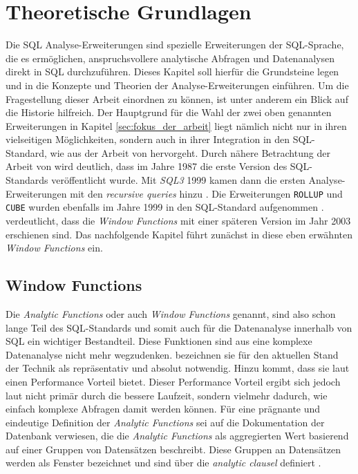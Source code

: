 \chapter{Theoretische Grundlagen}
\label{chap:hintergund_und_grundlagen} Die SQL Analyse-Erweiterungen sind spezielle
Erweiterungen der SQL-Sprache, die es ermöglichen, anspruchsvollere analytische Abfragen
und Datenanalysen direkt in SQL durchzuführen. Dieses Kapitel soll hierfür die
Grundsteine legen und in die Konzepte und Theorien der Analyse-Erweiterungen
einführen. Um die Fragestellung dieser Arbeit einordnen zu können, ist unter
anderem ein Blick auf die Historie hilfreich. Der Hauptgrund für die Wahl der zwei
oben genannten Erweiterungen in Kapitel \ref{sec:fokus_der_arbeit} liegt nämlich
nicht nur in ihren vielseitigen Möglichkeiten, sondern auch in ihrer Integration
in den SQL-Standard, wie aus der Arbeit von \citet[S.~10]{grust2017advanced}
hervorgeht. Durch nähere Betrachtung der Arbeit von \citet[S.~10]{grust2017advanced} wird
deutlich, dass im Jahre 1987 die erste Version des SQL-Standards veröffentlicht
wurde. Mit \textit{SQL3} 1999 kamen dann die ersten Analyse-Erweiterungen mit den \textit{recursive
queries} hinzu \citep[vgl.][S.~10]{grust2017advanced}. Die Erweiterungen \texttt{ROLLUP}
und \texttt{CUBE} wurden ebenfalls im Jahre 1999 in den SQL-Standard aufgenommen
\citep[vgl.][Kapitel 9.12]{melton2001sql}. \citet[S.~10]{grust2017advanced}
verdeutlicht, dass die \textit{Window Functions} mit einer späteren Version im
Jahr 2003 erschienen sind. Das nachfolgende Kapitel führt zunächst in diese eben
erwähnten \textit{Window Functions} ein.

\section{Window Functions}
\label{sec:window_functions} Die \textit{Analytic Functions} oder auch \textit{Window
Functions} genannt, sind also schon lange Teil des SQL-Standards und somit auch für
die Datenanalyse innerhalb von SQL ein wichtiger Bestandteil. Diese Funktionen
sind aus eine komplexe Datenanalyse nicht mehr wegzudenken. \citet[S. 1244]{cao2012optimization}
bezeichnen sie für den aktuellen Stand der Technik als repräsentativ und absolut
notwendig. Hinzu kommt, dass sie laut \citet[S. 113]{kellenberger2019expert} einen
Performance Vorteil bietet. Dieser Performance Vorteil ergibt sich jedoch laut
\citet[S.~113]{kellenberger2019expert} nicht primär durch die bessere Laufzeit, sondern
vielmehr dadurch, wie einfach komplexe Abfragen damit werden können. Für eine
prägnante und eindeutige Definition der \textit{Analytic Functions} sei auf die Dokumentation
der \citet[K.~7]{oracle} Datenbank verwiesen, die die \textit{Analytic Functions} als
aggregierten Wert basierend auf einer Gruppen von Datensätzen beschreibt. Diese Gruppen
an Datensätzen werden als Fenster bezeichnet und sind über die \textit{analytic
clausel} definiert \citep[vgl.][K. 7]{oracle}.

